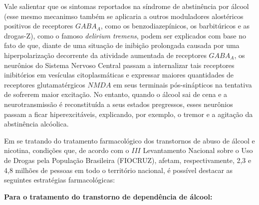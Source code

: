 \documentclass[
]{book}
\begin{document}
Vale salientar que os sintomas reportados na síndrome de abstinência por álcool (esse mesmo mecanimso também se aplicaria a outros moduladores alostéricos positivos de receptores \(GABA_A\), como os benzodiazepínicos, os barbitúricos e as drogas-Z), como o famoso \emph{delirium tremens}, podem ser explicados com base no fato de que, diante de uma situação de inibição prolongada causada por uma hiperpolarização decorrente da atividade aumentada de receptores \(GABA_A\), os neurônios do Sistema Nervoso Central passam a internalizar tais receptores inibitórios em vesículas citoplasmáticas e expressar maiores quantidades de receptores glutamatérgicos \(NMDA\) em seus terminais pós-sinápticos na tentativa de sofrerem maior excitação. No entanto, quando o álcool sai de cena e a neurotransmissão é reconstituída a seus estados pregressos, esses neurônios passam a ficar hiperexcitáveis, explicando, por exemplo, o tremor e a agitação da abstinência alcóolica.

Em se tratando do tratamento farmacológico dos transtornos de abuso de álcool e nicotina, condições que, de acordo com o \(III\) Levantamento Nacional sobre o Uso de Drogas pela População Brasileira (FIOCRUZ), afetam, respectivamente, 2,3 e 4,8 milhões de pessoas em todo o território nacional, é possível destacar as seguintes estratégias farmacológicas:

\textbf{Para o tratamento do transtorno de dependência de álcool:}
\end{document}
